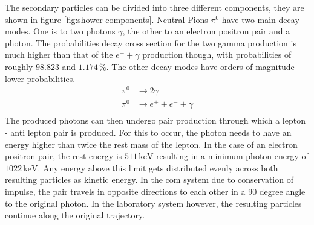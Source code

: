 \documentclass[abstract,toc,los,lof,english,10pt,glossary,acronyms]{jluthesis}
\begin{document}
The secondary particles can be divided into three different components, they are shown in figure \ref{fig:shower-components}.
Neutral Pions $\pi^0$ have two main decay modes. One is to two photons $\gamma$, the other to an electron positron pair and a photon. The probabilities decay cross section for the two gamma production is much higher than that of the $e^\pm + \gamma$ production though, with probabilities of roughly $98.823$ and $1.174\,\%$.\cite[1213]{10.1093/ptep/ptaa104} The other decay modes have orders of magnitude lower probabilities.
\begin{equation}
	\begin{aligned}
		\pi^0 &\rightarrow 2\gamma \\
		\pi^0 &\rightarrow e^+ + e^- + \gamma \\
	\end{aligned}
\end{equation}
The produced photons can then undergo pair production through which a lepton - anti lepton pair is produced. For this to occur, the photon needs to have an energy higher than twice the rest mass of the lepton. In the case of an electron positron pair, the rest energy is $511\,\text{keV}$ resulting in a minimum photon energy of $1022\,\text{keV}$. Any energy above this limit gets distributed evenly across both resulting particles as kinetic energy. In the \acrfull{com} system due to conservation of impulse, the pair travels in opposite directions to each other in a 90 degree angle to the original photon. In the laboratory system however, the resulting particles continue along the original trajectory.
\end{document}
